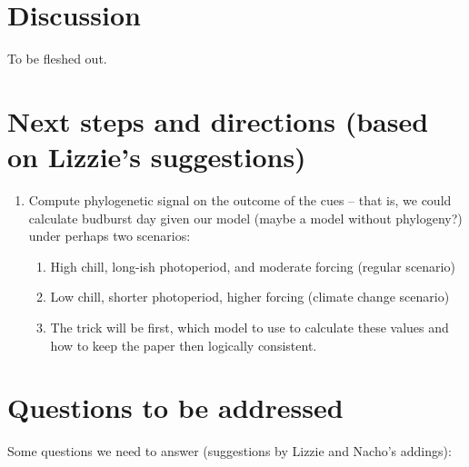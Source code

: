 \documentclass{article}\usepackage[]{graphicx}\usepackage[]{color}
\begin{document}

\section*{Discussion}
To be fleshed out.







\section*{Next steps and directions (based on Lizzie's suggestions)}
\begin{enumerate}
\item Compute phylogenetic signal on the outcome of the cues -- that is, we could calculate budburst day given our model (maybe a model without phylogeny?) under perhaps two scenarios:
     
\begin{enumerate}
\item High chill, long-ish photoperiod, and moderate forcing (regular scenario)

\item Low chill, shorter photoperiod, higher forcing (climate change scenario)

\item The trick will be first, which model to use to calculate these values and how to keep the paper then logically consistent.
\end{enumerate}
  
\end{enumerate}


\section*{Questions to be addressed}

Some questions we need to answer (suggestions by Lizzie and Nacho's addings):
\end{document}
